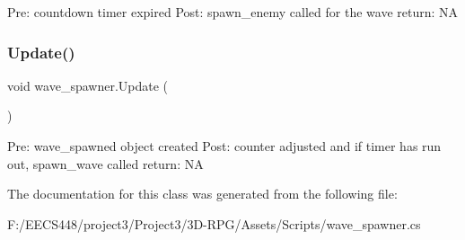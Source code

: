 Pre\+: countdown timer expired Post\+: spawn\+\_\+enemy called for the wave return\+: NA \mbox{\label{classwave__spawner_ae049116b14cb20519c1c5a2dc2b824d8}} 
\subsubsection{\texorpdfstring{Update()}{Update()}}
{\footnotesize\ttfamily void wave\+\_\+spawner.\+Update (\begin{DoxyParamCaption}{ }\end{DoxyParamCaption})\hspace{0.3cm}{\ttfamily [private]}}

Pre\+: wave\+\_\+spawned object created Post\+: counter adjusted and if timer has run out, spawn\+\_\+wave called return\+: NA 

The documentation for this class was generated from the following file\+:\begin{DoxyCompactItemize}
\item 
F\+:/\+E\+E\+C\+S448/project3/\+Project3/3\+D-\/\+R\+P\+G/\+Assets/\+Scripts/wave\+\_\+spawner.\+cs\end{DoxyCompactItemize}
